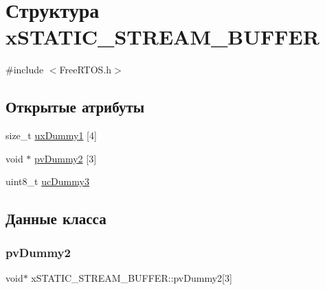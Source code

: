 \hypertarget{structx_s_t_a_t_i_c___s_t_r_e_a_m___b_u_f_f_e_r}{}\section{Структура x\+S\+T\+A\+T\+I\+C\+\_\+\+S\+T\+R\+E\+A\+M\+\_\+\+B\+U\+F\+F\+ER}
\label{structx_s_t_a_t_i_c___s_t_r_e_a_m___b_u_f_f_e_r}


{\ttfamily \#include $<$Free\+R\+T\+O\+S.\+h$>$}

\subsection*{Открытые атрибуты}
\begin{DoxyCompactItemize}
\item 
size\+\_\+t \mbox{\hyperlink{structx_s_t_a_t_i_c___s_t_r_e_a_m___b_u_f_f_e_r_a9020496ea46d0d95451ed11b3193fa09}{ux\+Dummy1}} \mbox{[}4\mbox{]}
\item 
void $\ast$ \mbox{\hyperlink{structx_s_t_a_t_i_c___s_t_r_e_a_m___b_u_f_f_e_r_a7603bb483828c39906839c90c4e70fe9}{pv\+Dummy2}} \mbox{[}3\mbox{]}
\item 
uint8\+\_\+t \mbox{\hyperlink{structx_s_t_a_t_i_c___s_t_r_e_a_m___b_u_f_f_e_r_a7a6df8a6f408f01b245c0c90732dea72}{uc\+Dummy3}}
\end{DoxyCompactItemize}


\subsection{Данные класса}
\mbox{\label{structx_s_t_a_t_i_c___s_t_r_e_a_m___b_u_f_f_e_r_a7603bb483828c39906839c90c4e70fe9}} 
\subsubsection{\texorpdfstring{pvDummy2}{pvDummy2}}
{\footnotesize\ttfamily void$\ast$ x\+S\+T\+A\+T\+I\+C\+\_\+\+S\+T\+R\+E\+A\+M\+\_\+\+B\+U\+F\+F\+E\+R\+::pv\+Dummy2\mbox{[}3\mbox{]}}

\mbox{\label{structx_s_t_a_t_i_c___s_t_r_e_a_m___b_u_f_f_e_r_a7a6df8a6f408f01b245c0c90732dea72}} 
